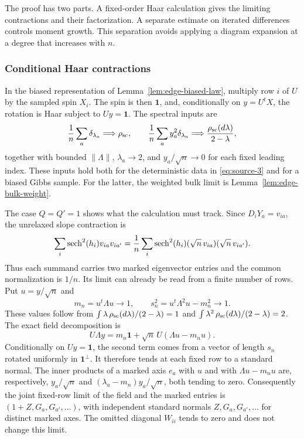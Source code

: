 The proof has two parts. A fixed-order Haar calculation gives the limiting
contractions and their factorization. A separate estimate on iterated
differences controls moment growth. This separation avoids applying a
diagram expansion at a degree that increases with $n$.

\subsubsection{Conditional Haar contractions}

In the biased representation of Lemma~\ref{lem:edge-biased-law}, multiply
row $i$ of $U$ by the sampled spin $X_i$. The spin is then $\mathbf1$, and,
conditionally on $y=U^tX$, the rotation is Haar subject to $Uy=\mathbf1$.
The spectral inputs are
\[
 \frac1n\sum_a\delta_{\lambda_a}\Longrightarrow\rho_{\rm sc},
 \qquad
 \frac1n\sum_a y_a^2\delta_{\lambda_a}
      \Longrightarrow\frac{\rho_{\rm sc}(d\lambda)}{2-\lambda},
\]
together with bounded $\|\Lambda\|$, $\lambda_a\to2$, and
$y_a/\sqrt n\to0$ for each fixed leading index. These inputs hold both for
the deterministic data in \eqref{eq:source-3} and for a biased Gibbs sample.
For the latter, the weighted bulk limit is Lemma~\ref{lem:edge-bulk-weight}.

The case $Q=Q'=1$ shows what the calculation must track. Since
$D_iY_a=v_{ia}$, the unrelaxed slope contraction is
\[
 \sum_i\operatorname{sech}^2(h_i)v_{ia}v_{ia'}
   =\frac1n\sum_i\operatorname{sech}^2(h_i)
                     (\sqrt n\,v_{ia})(\sqrt n\,v_{ia'}).
\]
Thus each summand carries two marked eigenvector entries and the common
normalization is $1/n$. Its limit can already be read from a finite number
of rows. Put $u=y/\sqrt n$ and
\[
 m_n=u^t\Lambda u\longrightarrow1,\qquad
 s_n^2=u^t\Lambda^2u-m_n^2\longrightarrow1.
\]
These values follow from
$\int\lambda\,\rho_{\rm sc}(d\lambda)/(2-\lambda)=1$ and
$\int\lambda^2\,\rho_{\rm sc}(d\lambda)/(2-\lambda)=2$.
The exact field decomposition is
\[
 U\Lambda y=m_n\mathbf1+\sqrt n\,U(\Lambda u-m_nu).
\]
Conditionally on $Uy=\mathbf1$, the second term comes from a vector of
length $s_n$ rotated uniformly in $\mathbf1^\perp$.
It therefore tends at each fixed row to a standard normal.
The inner products of a marked axis $e_a$ with $u$ and with
$\Lambda u-m_nu$ are, respectively,
$y_a/\sqrt n$ and $(\lambda_a-m_n)y_a/\sqrt n$, both tending to zero.
Consequently the joint fixed-row limit of the field and the marked
entries is $(1+Z,G_a,G_{a'},\ldots)$, with independent standard normals
$Z,G_a,G_{a'},\ldots$ for distinct marked axes. The omitted diagonal
$W_{ii}$ tends to zero and does not change this limit.

